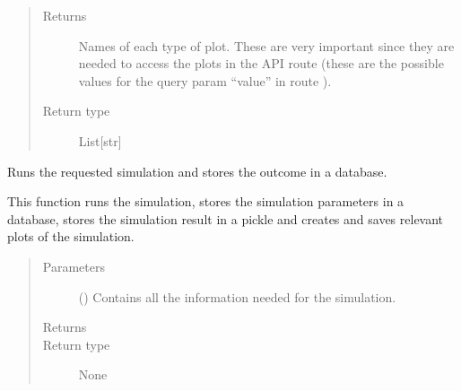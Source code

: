 \documentclass[a4paper,landscape,10pt,english]{sphinxmanual}
\begin{document}
\begin{fulllineitems}
\begin{quote}
\begin{description}
\begin{itemize}
\end{itemize}

\item[{Returns}] \leavevmode
{} \textendash{} Names of each type of plot. These are very important since they are
needed to access the plots in the API route (these are the possible
values for the query param “value” in route
).

\item[{Return type}] \leavevmode
List{[}str{]}

\end{description}\end{quote}

\end{fulllineitems}


\begin{fulllineitems}
\label{\detokenize{code_docs/simulation_API.controller:simulation_API.controller.tasks._run_simulation}}
Runs the requested simulation and stores the outcome in a database.

This function runs the simulation, stores the simulation parameters in a
database, stores the simulation result in a pickle and creates and saves
relevant plots of the simulation.
\begin{quote}\begin{description}
\item[{Parameters}] \leavevmode
{} ({\hyperref[\detokenize{code_docs/simulation_API.controller:simulation_API.controller.schemas.SimRequest}]{}}) \textendash{} Contains all the information needed for the simulation.

\item[{Returns}] \leavevmode


\item[{Return type}] \leavevmode
None

\end{description}\end{quote}

\end{fulllineitems}
\end{document}
